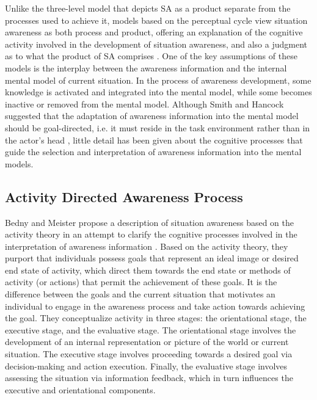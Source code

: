 Unlike the three-level model that depicts SA as a product separate from the processes used to achieve it, models based on the perceptual cycle view situation awareness as both process and product, offering an explanation of the cognitive activity involved in the development of situation awareness, and also a judgment as to what the product of SA comprises \cite{Salmon2008}. One of the key assumptions of these models is the interplay between the awareness information and the internal mental model of current situation. In the process of awareness development, some knowledge is activated and integrated into the mental model, while some becomes inactive or removed from the mental model. Although Smith and Hancock suggested that the adaptation of awareness information into the mental model should be goal-directed, i.e. it must reside in the task environment rather than in the actor's head \cite{Smith1995}, little detail has been given about the cognitive processes that guide the selection and interpretation of awareness information into the mental models.

\subsection{Activity Directed Awareness Process} %
\label{sub:activity_directed_awareness_process}
Bedny and Meister propose a description of situation awareness based on the activity theory in an attempt to clarify the cognitive processes involved in the interpretation of awareness information \cite{Bedny1999}. Based on the activity theory, they purport that individuals possess goals that represent an ideal image or desired end state of activity, which direct them towards the end state or methods of activity (or actions) that permit the achievement of these goals. It is the difference between the goals and the current situation that motivates an individual to engage in the awareness process and take action towards achieving the goal. They conceptualize activity in three stages: the orientational stage, the executive stage, and the evaluative stage. The orientational stage involves the development of an internal representation or picture of the world or current situation. The executive stage involves proceeding towards a desired goal via decision-making and action execution. Finally, the evaluative stage involves assessing the situation via information feedback, which in turn influences the executive and orientational components.

